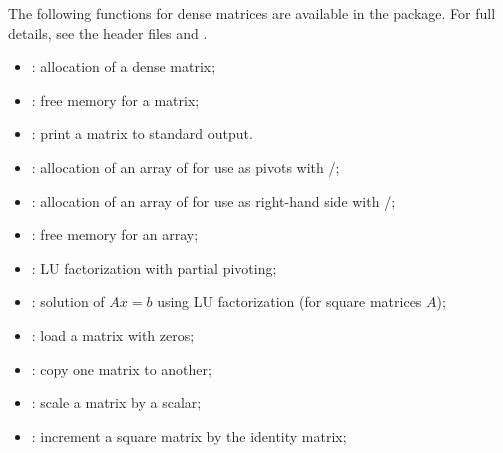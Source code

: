 The following functions for  dense matrices are available
in the {\dense} package.  For full details, see the header files
 and .
\begin{itemize}
\item {}: allocation of a  dense matrix;
\item {}: free memory for a  matrix;
\item {}: print a  matrix to standard output.
\item {}: allocation of an array of  for use
  as pivots with /;
\item {}: allocation of an array of  for use
  as right-hand side with /;
\item {}: free memory for an array;
\item {}: LU factorization with partial pivoting;
\item {}: solution of $Ax = b$ using LU factorization (for square matrices $A$);
\item {}: load a matrix with zeros;
\item {}: copy one matrix to another;
\item {}: scale a matrix by a scalar;
\item {}: increment a square matrix by the identity matrix;
\end{itemize}

